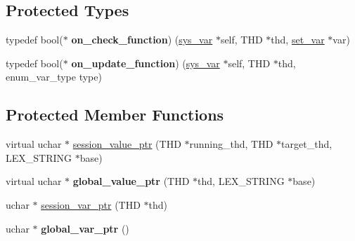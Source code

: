 \subsection*{Protected Types}
\begin{DoxyCompactItemize}
\item 
\mbox{\label{classsys__var_a7d778c4f880e6dad7defade1b724c3fe}} 
typedef bool($\ast$ {\bfseries on\+\_\+check\+\_\+function}) (\mbox{\hyperlink{classsys__var}{sys\+\_\+var}} $\ast$self, T\+HD $\ast$thd, \mbox{\hyperlink{classset__var}{set\+\_\+var}} $\ast$var)
\item 
\mbox{\label{classsys__var_a0b89f69aeb80839ff01cd105142e5dc6}} 
typedef bool($\ast$ {\bfseries on\+\_\+update\+\_\+function}) (\mbox{\hyperlink{classsys__var}{sys\+\_\+var}} $\ast$self, T\+HD $\ast$thd, enum\+\_\+var\+\_\+type type)
\end{DoxyCompactItemize}
\subsection*{Protected Member Functions}
\begin{DoxyCompactItemize}
\item 
virtual uchar $\ast$ \mbox{\hyperlink{classsys__var_a3e511591aaf555d2bc2ce40a80b7e899}{session\+\_\+value\+\_\+ptr}} (T\+HD $\ast$running\+\_\+thd, T\+HD $\ast$target\+\_\+thd, L\+E\+X\+\_\+\+S\+T\+R\+I\+NG $\ast$base)
\item 
\mbox{\label{classsys__var_adbfb8c70ec6b9ee3f714bdad69000656}} 
virtual uchar $\ast$ {\bfseries global\+\_\+value\+\_\+ptr} (T\+HD $\ast$thd, L\+E\+X\+\_\+\+S\+T\+R\+I\+NG $\ast$base)
\item 
uchar $\ast$ \mbox{\hyperlink{classsys__var_a3bb0c5e51788a922172436774523f032}{session\+\_\+var\+\_\+ptr}} (T\+HD $\ast$thd)
\item 
\mbox{\label{classsys__var_a2ce83c34eb0a9bc446376404b353d533}} 
uchar $\ast$ {\bfseries global\+\_\+var\+\_\+ptr} ()
\end{DoxyCompactItemize}
